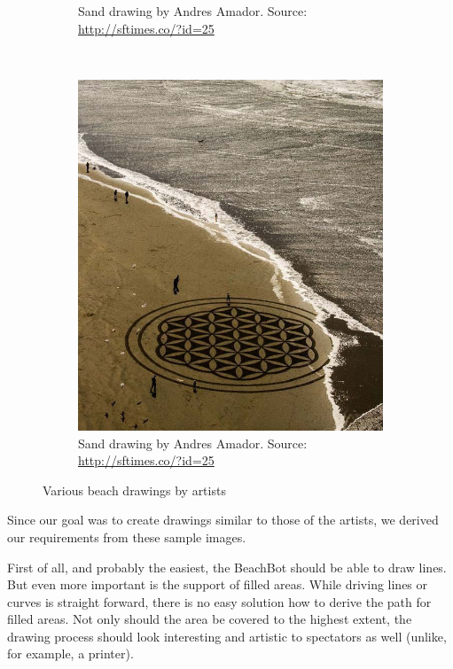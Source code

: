 \begin{figure}
\begin{subfigure}[b]{0.46\textwidth}
\caption{Sand drawing by Andres Amador. Source: \url{http://sftimes.co/?id=25}}
\end{subfigure}
~
\begin{subfigure}[b]{0.46\textwidth}
\includegraphics[width=\textwidth]{images/requirements_inspiration/andres_armador_2.jpg} 
\caption{Sand drawing by Andres Amador. Source: \url{http://sftimes.co/?id=25}}
\end{subfigure}
\caption{Various beach drawings by artists}
\label{fig:sandart_inspiration}
\end{figure}

Since our goal was to create drawings similar to those of the artists, we derived our requirements from these sample images.

First of all, and probably the easiest, the BeachBot should be able to draw lines. But even more important is the support of filled areas. While driving lines or curves is straight forward, there is no easy solution how to derive the path for filled areas. Not only should the area be covered to the highest extent, the drawing process should look interesting and artistic to spectators as well (unlike, for example, a printer).

